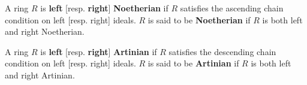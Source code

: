 A ring \(R\) is \textbf{left} [resp. \textbf{right}] \textbf{Noetherian} if \(R\) satisfies the ascending chain condition on left [resp. right] ideals. \(R\) is said to be \textbf{Noetherian} if \(R\) is both left and right Noetherian.

A ring \(R\) is \textbf{left} [resp. \textbf{right}] \textbf{Artinian} if \(R\) satisfies the descending chain condition on left [resp. right] ideals. \(R\) is said to be \textbf{Artinian} if \(R\) is both left and right Artinian.
